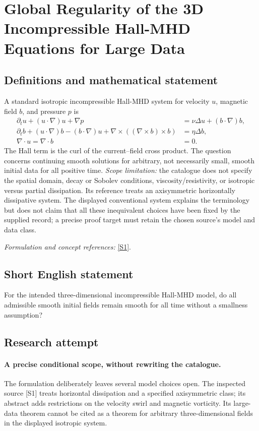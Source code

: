 \documentclass[11pt]{article}
\begin{document}
\section*{\texorpdfstring{Global Regularity of the 3D Incompressible Hall-MHD Equations for Large Data}{Global Regularity of the 3D Incompressible Hall-MHD Equations for Large Data}}\label{392}
\subsection{Definitions and mathematical statement}
A standard isotropic incompressible Hall-MHD system for velocity $u$, magnetic field $b$, and pressure $p$ is
\[
 \begin{aligned}
 \partial_tu+(u\cdot\nabla)u+\nabla p&=\nu\Delta u+(b\cdot\nabla)b,\\
 \partial_tb+(u\cdot\nabla)b-(b\cdot\nabla)u
   +\nabla\times((\nabla\times b)\times b)&=\eta\Delta b,\\
 \nabla\cdot u=\nabla\cdot b&=0.
 \end{aligned}
\]
The Hall term is the curl of the current--field cross product. The question concerns continuing smooth solutions for arbitrary, not necessarily small, smooth initial data for all positive time. \emph{Scope limitation:} the catalogue does not specify the spatial domain, decay or Sobolev conditions, viscosity/resistivity, or isotropic versus partial dissipation. Its reference treats an axisymmetric horizontally dissipative system. The displayed conventional system explains the terminology but does not claim that all these inequivalent choices have been fixed by the supplied record; a precise proof target must retain the chosen source's model and data class.
\par\smallskip\textit{Formulation and concept references:} \href{https://link.springer.com/article/10.1007/s44198-022-00063-8}{[S1]}.

\subsection{Short English statement}
For the intended three-dimensional incompressible Hall-MHD model, do all admissible smooth initial fields remain smooth for all time without a smallness assumption?
\subsection{Research attempt}
\paragraph{A precise conditional scope, without rewriting the catalogue.}
The formulation deliberately leaves several model choices open.
The inspected source [S1] treats horizontal dissipation and a
specified axisymmetric class; its abstract adds restrictions on
the velocity swirl and magnetic vorticity. Its large-data theorem
cannot be cited as a theorem for arbitrary three-dimensional
fields in the displayed isotropic system.
\end{document}
